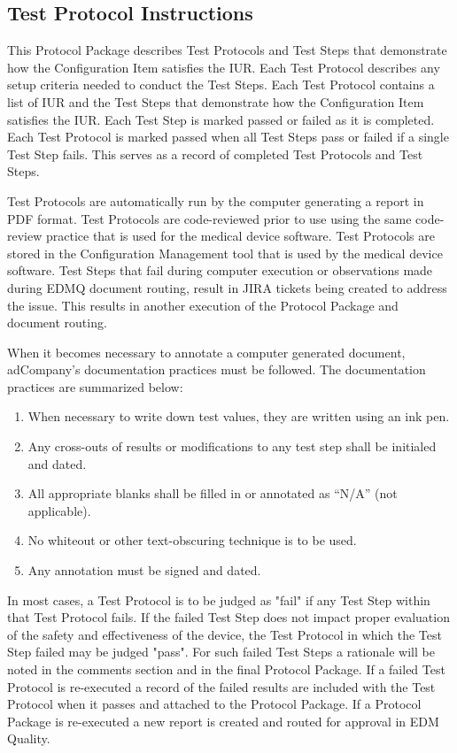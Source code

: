 \subsection{Test Protocol Instructions}
This Protocol Package describes Test Protocols and Test Steps that demonstrate
how the Configuration Item satisfies the IUR.  Each Test Protocol describes any
setup criteria needed to conduct the Test Steps. Each Test Protocol contains a
list of IUR and the Test Steps that demonstrate how the Configuration Item
satisfies the IUR. Each Test Step is marked passed or failed as it is completed.
Each Test Protocol is marked passed when all Test Steps pass or failed if a
single Test Step fails.  This serves as a record of completed Test Protocols and
Test Steps.

Test Protocols are automatically run by the computer generating a report in PDF
format.  Test Protocols are code-reviewed prior to use using the same
code-review practice that is used for the medical device software.  Test
Protocols are stored in the Configuration Management tool that is used by the
medical device software.  Test Steps that fail during computer execution or
observations made during EDMQ document routing, result in JIRA tickets being
created to address the issue.  This results in another execution of the Protocol
Package and document routing.

When it becomes necessary to annotate a computer generated document, adCompany's
documentation practices must be followed.  The documentation practices are
summarized below:

\begin{enumerate}
\item When necessary to write down test values, they are written using
an ink pen.
\item Any cross-outs of results or modifications to any test step shall be initialed and dated.
\item All appropriate blanks shall be filled in or annotated as ``N/A'' (not applicable).
\item No whiteout or other text-obscuring technique is to be used.
\item Any annotation must be signed and dated.
\end{enumerate}

In most cases, a Test Protocol is to be judged as "fail" if any Test Step within
that Test Protocol fails. If the failed Test Step does not impact proper
evaluation of the safety and effectiveness of the device, the Test Protocol in
which the Test Step failed may be judged "pass".  For such failed Test Steps a
rationale will be noted in the comments section and in the final Protocol
Package.  If a failed Test Protocol is re-executed a record of the failed
results are included with the Test Protocol when it passes and attached to the
Protocol Package.  If a Protocol Package is re-executed a new report is
created and routed for approval in EDM Quality.

